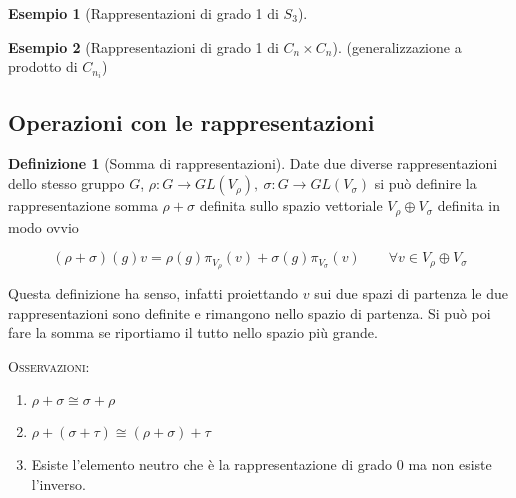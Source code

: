 \documentclass[11pt]{article}
\theoremstyle{plain}
\theoremstyle{definition}
\newtheorem{defn}{Definizione}[section]
\newtheorem{exmp}{Esempio}[section]
\theoremstyle{remark}
\begin{document}
\begin{exmp}[Rappresentazioni di grado 1 di $S_3$]

\end{exmp}

\begin{exmp}[Rappresentazioni di grado 1 di $C_n \times C_n$]


(generalizzazione a prodotto di $C_{n_i}$)
\end{exmp}














\newpage
\subsection{Operazioni con le rappresentazioni}

\begin{defn}[Somma di rappresentazioni]
  Date due diverse rappresentazioni dello stesso gruppo $G$, $\rho: G \to GL(V_\rho), \ \sigma: G \to GL(V_\sigma)$ si può definire la rappresentazione somma $\rho + \sigma$ definita sullo spazio vettoriale $V_\rho \oplus V_\sigma$ definita in modo ovvio

  \[ (\rho + \sigma)(g) v = \rho(g) \pi_{V_\rho}(v) + \sigma(g) \pi_{V_\sigma}(v) \qquad \forall v \in V_\rho \oplus V_\sigma \]

  Questa definizione ha senso, infatti proiettando $v$ sui due spazi di partenza le due rappresentazioni sono definite e rimangono nello spazio di partenza. Si può poi fare la somma se riportiamo il tutto nello spazio più grande.
\label{defn:somma di rappresentazioni}
\end{defn}

\textsc{Osservazioni:}

\begin{enumerate}
\item $\rho + \sigma \cong \sigma + \rho$
\item $\rho + (\sigma + \tau) \cong (\rho + \sigma ) + \tau$
\item Esiste l'elemento neutro che è la rappresentazione di grado 0 ma non esiste l'inverso.

\end{enumerate}
\end{document}
